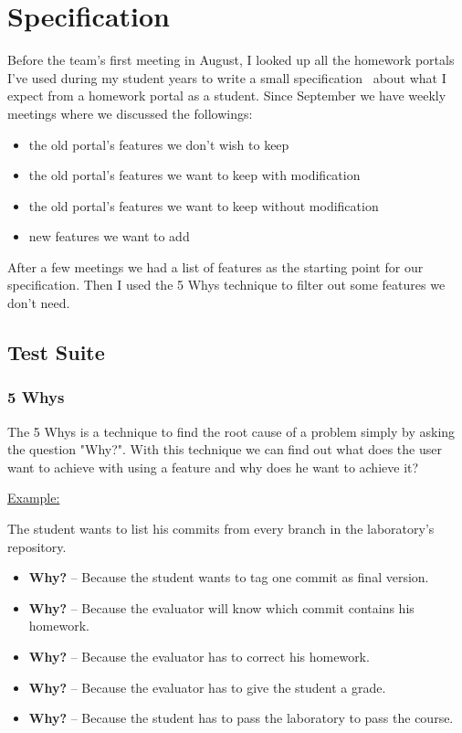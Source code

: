 \chapter{Specification}

Before the team's first meeting in August, I looked up all the homework portals I've used during my student years to write a small specification~\cite{Szepes-specification} about what I expect from a homework portal as a student. Since September we have weekly meetings where we discussed the followings: 

\begin{itemize}
	\item the old portal's features we don't wish to keep
	\item the old portal's features we want to keep with modification
	\item the old portal's features we want to keep without modification
	\item new features we want to add
\end{itemize}

After a few meetings we had a list of features as the starting point for our specification. Then I used the 5 Whys technique to filter out some features we don't need.

\section{Test Suite}
\subsection{5 Whys}

The 5 Whys is a technique to find the root cause of a problem simply by asking the question "Why?". With this technique we can find out what does the user want to achieve with using a feature and why does he want to achieve it?

\underline{Example:}

The student wants to list his commits from every branch in the laboratory's repository.
\begin{itemize}
	\item \textbf{Why?} -- Because the student wants to tag one commit as final version.
	\item \textbf{Why?} -- Because the evaluator will know which commit contains his homework.
	\item \textbf{Why?} -- Because the evaluator has to correct his homework.
	\item \textbf{Why?} -- Because the evaluator has to give the student a grade.
	\item \textbf{Why?} -- Because the student has to pass the laboratory to pass the course.
\end{itemize}

